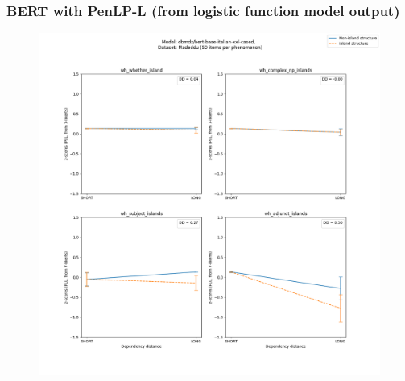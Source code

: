 \subsubsection{BERT with PenLP-L (from logistic function model output)}
\begin{figure}[h]
	\centering
	\includegraphics[width=1\textwidth]{images/AppendixA/Madeddu_wh_dbmdz_bert-base-italian-xxl-cased_PLL-zscores-likert-2022-07-11.png} 
\end{figure}

\clearpage
